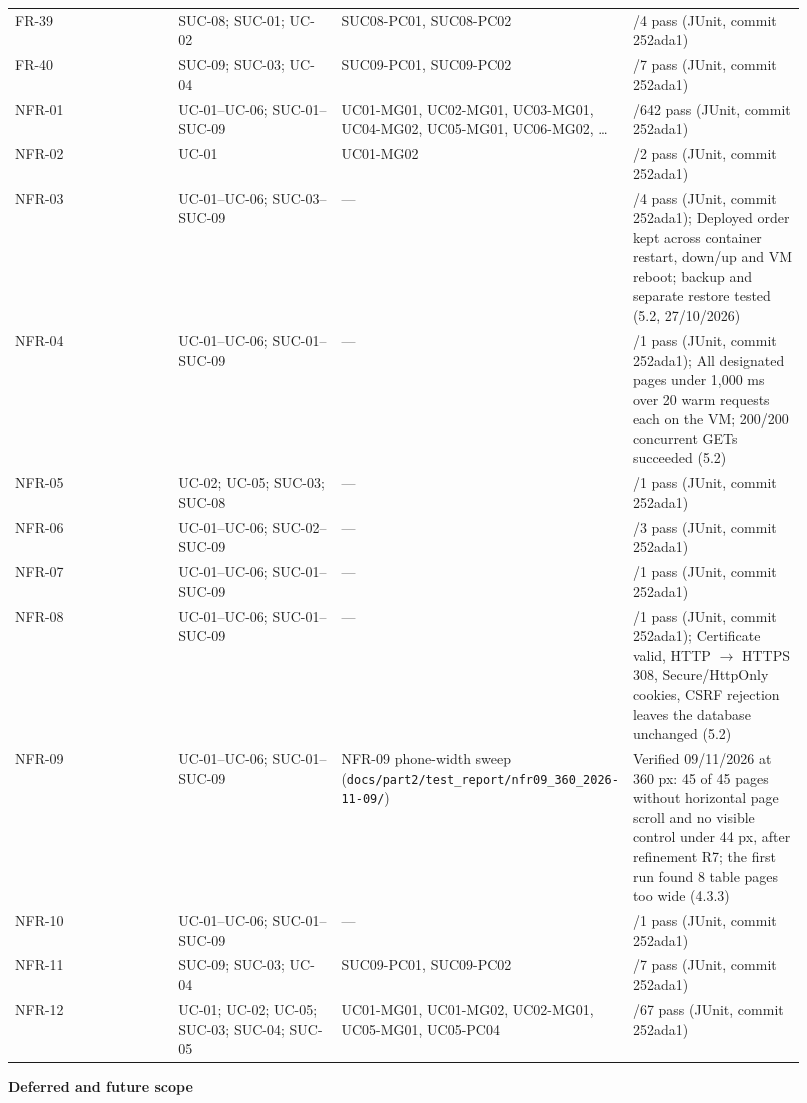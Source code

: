\begin{longtable}{>{\raggedright\arraybackslash}p{0.2300\linewidth}>{\raggedright\arraybackslash}p{0.2300\linewidth}>{\raggedright\arraybackslash}p{0.2300\linewidth}>{\raggedright\arraybackslash}p{0.2300\linewidth}}
FR-39 & SUC-08; SUC-01; UC-02 & SUC08-PC01, SUC08-PC02 & 4/4 pass (JUnit, commit 252ada1) \\
FR-40 & SUC-09; SUC-03; UC-04 & SUC09-PC01, SUC09-PC02 & 7/7 pass (JUnit, commit 252ada1) \\
NFR-01 & UC-01--UC-06; SUC-01--SUC-09 & UC01-MG01, UC02-MG01, UC03-MG01, UC04-MG02, UC05-MG01, UC06-MG02, \ldots{} & 642/642 pass (JUnit, commit 252ada1) \\
NFR-02 & UC-01 & UC01-MG02 & 2/2 pass (JUnit, commit 252ada1) \\
NFR-03 & UC-01--UC-06; SUC-03--SUC-09 & --- & 4/4 pass (JUnit, commit 252ada1); Deployed order kept across container restart, down/up and VM reboot; backup and separate restore tested (5.2, 27/10/2026) \\
NFR-04 & UC-01--UC-06; SUC-01--SUC-09 & --- & 1/1 pass (JUnit, commit 252ada1); All designated pages under 1,000 ms over 20 warm requests each on the VM; 200/200 concurrent GETs succeeded (5.2) \\
NFR-05 & UC-02; UC-05; SUC-03; SUC-08 & --- & 1/1 pass (JUnit, commit 252ada1) \\
NFR-06 & UC-01--UC-06; SUC-02--SUC-09 & --- & 3/3 pass (JUnit, commit 252ada1) \\
NFR-07 & UC-01--UC-06; SUC-01--SUC-09 & --- & 1/1 pass (JUnit, commit 252ada1) \\
NFR-08 & UC-01--UC-06; SUC-01--SUC-09 & --- & 1/1 pass (JUnit, commit 252ada1); Certificate valid, HTTP \ensuremath{\rightarrow} HTTPS 308, Secure/HttpOnly cookies, CSRF rejection leaves the database unchanged (5.2) \\
NFR-09 & UC-01--UC-06; SUC-01--SUC-09 & NFR-09 phone-width sweep (\texttt{docs/\allowbreak{}part2/\allowbreak{}test\_\allowbreak{}report/\allowbreak{}nfr09\_\allowbreak{}360\_\allowbreak{}2026-11-09/\allowbreak{}}) & Verified 09/11/2026 at 360 px: 45 of 45 pages without horizontal page scroll and no visible control under 44 px, after refinement R7; the first run found 8 table pages too wide (4.3.3) \\
NFR-10 & UC-01--UC-06; SUC-01--SUC-09 & --- & 1/1 pass (JUnit, commit 252ada1) \\
NFR-11 & SUC-09; SUC-03; UC-04 & SUC09-PC01, SUC09-PC02 & 7/7 pass (JUnit, commit 252ada1) \\
NFR-12 & UC-01; UC-02; UC-05; SUC-03; SUC-04; SUC-05 & UC01-MG01, UC01-MG02, UC02-MG01, UC05-MG01, UC05-PC04 & 67/67 pass (JUnit, commit 252ada1) \\
\end{longtable}
\textbf{Deferred and future scope}


